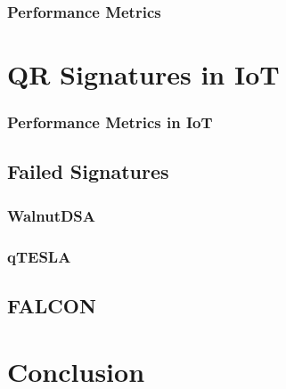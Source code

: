 \documentclass[conference]{IEEEtran}
\begin{document}
\subsubsection{Performance Metrics}

\section{QR Signatures in IoT}
\subsubsection{Performance Metrics in IoT}
\subsection{Failed Signatures}
\subsubsection{WalnutDSA}
\subsubsection{qTESLA}
\subsection{FALCON}

\section{Conclusion}



\end{document}
